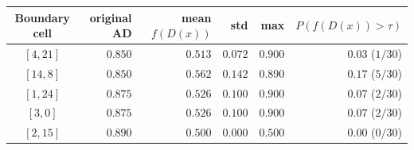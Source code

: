 \small
\setlength{\tabcolsep}{5pt}
\begin{tabular}{crrrrr}
\toprule
Boundary cell & original AD & mean $f(D(x))$ & std     & max     & $P(f(D(x)){>}\tau)$ \\
\midrule
$[4, 21]$     & $0.850$     & $0.513$        & $0.072$ & $0.900$ & $0.03$ ($1/30$) \\
$[14, 8]$     & $0.850$     & $0.562$        & $0.142$ & $0.890$ & $0.17$ ($5/30$) \\
$[1, 24]$     & $0.875$     & $0.526$        & $0.100$ & $0.900$ & $0.07$ ($2/30$) \\
$[3, 0]$      & $0.875$     & $0.526$        & $0.100$ & $0.900$ & $0.07$ ($2/30$) \\
$[2, 15]$     & $0.890$     & $0.500$        & $0.000$ & $0.500$ & $0.00$ ($0/30$) \\
\bottomrule
\end{tabular}
